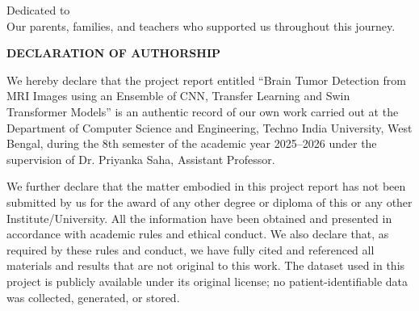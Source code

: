 \documentclass[12pt,a4paper,oneside]{report}
\begin{document}

\newpage
\thispagestyle{empty}
\mbox{}


\newpage
\thispagestyle{empty}

\vspace*{7cm}

\begin{center}
{\Huge Dedicated to}\\[1cm]
Our parents, families, and teachers who supported us throughout this journey.
\end{center}


\newpage
\thispagestyle{empty}
\mbox{}


\newpage

\begin{center}
{\Large \textbf{DECLARATION OF AUTHORSHIP}}
\end{center}

\vspace{1cm}

We hereby declare that the project report entitled ``Brain Tumor Detection from MRI Images using an Ensemble of CNN, Transfer Learning and Swin Transformer Models'' is an authentic
record of our own work carried out at the Department of Computer Science and
Engineering, Techno India University, West Bengal, during the 8th semester
of the academic year 2025--2026 under the supervision of Dr. Priyanka Saha,
Assistant Professor.

\vspace{0.5cm}

We further declare that the matter embodied in this project report has not been submitted
by us for the award of any other degree or diploma of this or any other Institute/University.
All the information have been obtained and presented in accordance with academic
rules and ethical conduct. We also declare that, as required by these rules and conduct,
we have fully cited and referenced all materials and results that are not original to this
work. The dataset used in this project is publicly available under its original license; no
patient-identifiable data was collected, generated, or stored.
\end{document}
